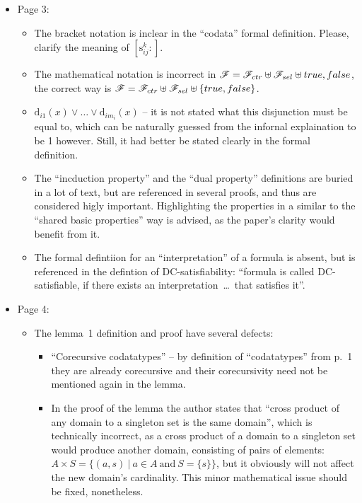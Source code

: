 \begin{itemize}
	\item Page 3:
	\begin{itemize}
		\item The bracket notation is inclear in the ``codata'' formal definition. Please, clarify the meaning of $\left[ \mathrm{s}^{k}_{ij} : \right]$.
		\item The mathematical notation is incorrect in $\mathscr{F} = \mathscr{F}_{ctr} \uplus \mathscr{F}_{sel} \uplus true,false$, the correct way is $\mathscr{F} = \mathscr{F}_{ctr} \uplus \mathscr{F}_{sel} \uplus \{true,false\}$.
		\item $\mathrm{d}_{i1}(x) \lor \dots \lor \mathrm{d}_{im_i}(x)$ -- it is not stated what this disjunction must be equal to, which can be naturally guessed from the infornal explaination to be 1 however. Still, it had better be stated clearly in the formal definition.
		\item The ``incduction property'' and the ``dual property'' definitions are buried in a lot of text, but are referenced in several proofs, and thus are considered higly important. Highlighting the properties in a similar to the ``shared basic properties'' way is advised, as the paper's clarity would benefit from it.
		\item The formal defintiion for an ``interpretation'' of a formula is absent, but is referenced in the defintion of DC-satisfiability: ``formula is called DC-satisfiable, if there exists an interpretation~\dots~that satisfies it''.
	\end{itemize}

	\item Page 4:
	\begin{itemize}
		\item The lemma~1 definition and proof have several defects:
		\begin{itemize}
			\item ``Corecursive codatatypes'' -- by definition of ``codatatypes'' from p.~1 they are already corecursive and their corecursivity need not be mentioned again in the lemma.
			\item In the proof of the lemma the author states that ``cross product of any domain to a singleton set is the same domain'', which is technically incorrect, as a cross product of a domain to a singleton set would produce another domain, consisting of pairs of elements: $A \times S = \{ (a, s)~|~a \in A~\mathrm{and}~S = \{s\} \}$, but it obviously will not affect the new domain's cardinality. This minor mathematical issue should be fixed, nonetheless.
		\end{itemize}
	\end{itemize}


\end{itemize}
